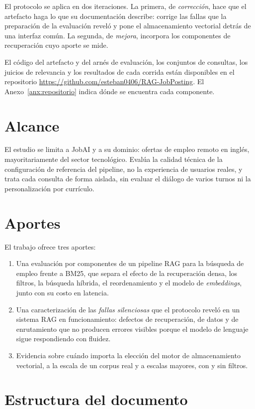 El protocolo se aplica en dos iteraciones. La primera, de \emph{corrección}, hace que el artefacto haga lo que su documentación describe: corrige las fallas que la preparación de la evaluación reveló y pone el almacenamiento vectorial detrás de una interfaz común. La segunda, de \emph{mejora}, incorpora los componentes de recuperación cuyo aporte se mide.

El código del artefacto y del arnés de evaluación, los conjuntos de consultas, los juicios de relevancia y los resultados de cada corrida están disponibles en el repositorio \url{https://github.com/esteban0406/RAG-JobPosting}. El Anexo~\ref{anx:repositorio} indica dónde se encuentra cada componente.

\section*{Alcance}

El estudio se limita a JobAI y a su dominio: ofertas de empleo remoto en inglés, mayoritariamente del sector tecnológico. Evalúa la calidad técnica de la configuración de referencia del pipeline, no la experiencia de usuarios reales, y trata cada consulta de forma aislada, sin evaluar el diálogo de varios turnos ni la personalización por currículo.

\section*{Aportes}

El trabajo ofrece tres aportes:
\begin{enumerate}
    \item Una evaluación por componentes de un pipeline RAG para la búsqueda de empleo frente a BM25, que separa el efecto de la recuperación densa, los filtros, la búsqueda híbrida, el reordenamiento y el modelo de \textit{embeddings}, junto con su costo en latencia.
    \item Una caracterización de las \emph{fallas silenciosas} que el protocolo reveló en un sistema RAG en funcionamiento: defectos de recuperación, de datos y de enrutamiento que no producen errores visibles porque el modelo de lenguaje sigue respondiendo con fluidez.
    \item Evidencia sobre cuándo importa la elección del motor de almacenamiento vectorial, a la escala de un corpus real y a escalas mayores, con y sin filtros.
\end{enumerate}

\section*{Estructura del documento}

